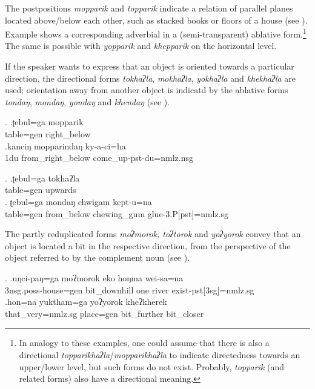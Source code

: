 The postpositions \emph{mopparik} and \emph{topparik} indicate a relation of parallel planes located above/below each other, such as stacked books or floors of a house (see \Next[a]). Example \Next[b] shows a corresponding adverbial in a (semi-transparent) ablative form.\footnote{In analogy to these examples, one could assume that  there is also a directional \emph{topparikhaʔla}/\emph{mopparikhaʔla} to indicate directedness towards an upper/lower level, but such forms do not exist. Probably, \emph{topparik} (and related forms) also have a directional meaning.}  The same is possible with \emph{yopparik} and \emph{khepparik} on the horizontal level.

If the speaker wants to express that an object  is oriented towards a particular direction, the directional forms \emph{tokhaʔla}, \emph{mokhaʔla}, \emph{yokhaʔla} and \emph{khekhaʔla}  are used; orientation away from another object is indicatd by the ablative forms  \emph{tondaŋ}, \emph{mondaŋ},   \emph{yondaŋ} and \emph{khendaŋ}  (see \NNext).
 
\ex. \ag.ʈebul=ga mopparik\\
table{\sc =gen} right\_below\\
\bg.kanciŋ mopparindaŋ ky-a-ci=ha\\
{\sc 1du} from\_right\_below come\_up{\sc -pst-du=nmlz.nsg}\\

\ex. \ag.ʈebul=ga tokhaʔla\\
table{\sc =gen} upwards\\
\bg. ʈebul=ga mondaŋ chwigam kept-u=na\\
table{\sc =gen} from\_below chewing\_gum  glue{\sc -3.P[pst]=nmlz.sg}\\

The partly reduplicated forms \emph{moʔmorok, toʔtorok} and \emph{yoʔyorok} convey that an object is located a bit in the respective direction, from the perspective of the object referred to by the complement noun (see \Next).

\ex. \ag.uŋci-paŋ=ga           moʔmorok          eko hoŋma wei-sa=na\\
{\sc 3nsg.poss-}house{\sc =gen}  bit\_downhill one river exist{\sc -pst[3sg]=nmlz.sg}\\
 
\bg.hon=na         yuktham=ga    yoʔyorok     kheʔkherek\\
that\_very{\sc =nmlz.sg} place{\sc =gen} bit\_further bit\_closer\\
 
		
